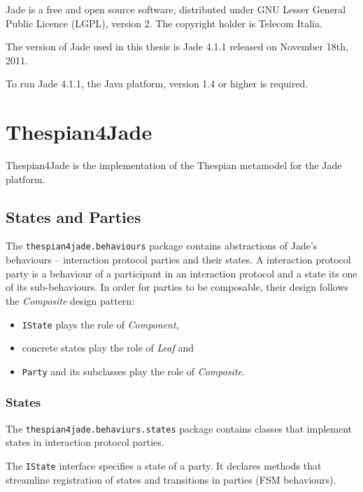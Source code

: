 Jade is a free and open source software, distributed under GNU Lesser General Public Licence (LGPL), version 2.
The copyright holder is Telecom Italia.

The version of Jade used in this thesis is Jade 4.1.1 released on November 18th, 2011.

To run Jade 4.1.1, the Java platform, version 1.4 or higher is required.

\section{Thespian4Jade}

Thespian4Jade is the implementation of the Thespian metamodel for the Jade platform.

\subsection{States and Parties}

The \texttt{thespian4jade.behaviours} package contains abstractions of Jade's behaviours -- interaction protocol parties and their states.
A interaction protocol party is a behaviour of a participant in an interaction protocol and a state its one of its sub-behaviours.
In order for parties to be composable, their design follows the \textit{Composite} design pattern:
\begin{itemize}
	\item \texttt{IState} plays the role of \textit{Component},
	\item concrete states play the role of \textit{Leaf} and
	\item \texttt{Party} and its subclasses play the role of \textit{Composite}.
\end{itemize}

\subsubsection{States}

The \texttt{thespian4jade.behaviurs.states} package contains classes that implement states in interaction protocol parties.

The \texttt{IState} interface specifies a state of a party.
It declares methods that streamline registration of states and transitions in parties (FSM behaviours).

